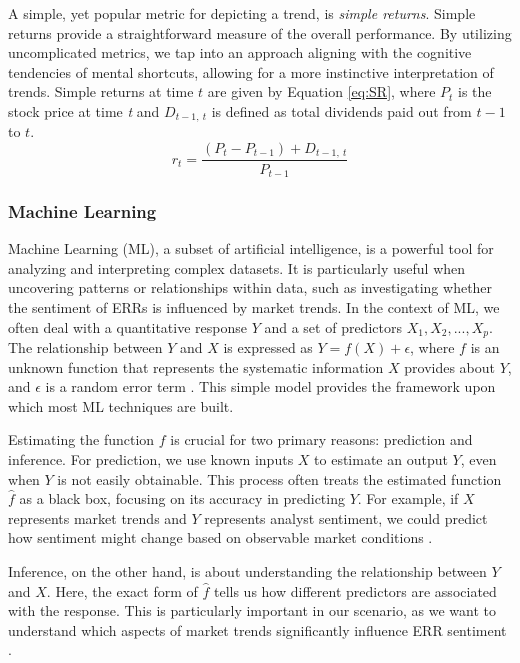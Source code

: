 A simple, yet popular metric for depicting a trend, is \textit{simple returns}. Simple returns provide a straightforward measure of the overall performance. By utilizing uncomplicated metrics, we tap into an approach aligning with the cognitive tendencies of mental shortcuts, allowing for a more instinctive interpretation of trends. Simple returns at time \(t\) are given by Equation \ref{eq:SR}, where $P_t$ is the stock price at time \textit{t} and \(D_{t-1,\:t}\) is defined as total dividends paid out from \(t-1\) to \(t\).
\begin{equation}\label{eq:SR}
    r_t=\frac{(P_t-P_{t-1})+D_{t-1,\:t}}{P_{t-1}}
\end{equation}

\subsubsection{Machine Learning}
Machine Learning (ML), a subset of artificial intelligence, is a powerful tool for analyzing and interpreting complex datasets. It is particularly useful when uncovering patterns or relationships within data, such as investigating whether the sentiment of ERRs is influenced by market trends. In the context of ML, we often deal with a quantitative response \(Y\) and a set of predictors \(X_1, X_2, ..., X_p\). The relationship between \(Y\) and \(X\) is expressed as \(Y=f(X)+\epsilon\), where \(f\) is an unknown function that represents the systematic information \(X\) provides about \(Y\), and \(\epsilon\) is a random error term \parencite{witten2013introduction}. This simple model provides the framework upon which most ML techniques are built.

Estimating the function \(f\) is crucial for two primary reasons: prediction and inference. For prediction, we use known inputs \(X\) to estimate an output \(Y\), even when \(Y\) is not easily obtainable. This process often treats the estimated function \(\hat{f}\) as a black box, focusing on its accuracy in predicting \(Y\). For example, if \(X\) represents market trends and \(Y\) represents analyst sentiment, we could predict how sentiment might change based on observable market conditions \parencite{witten2013introduction}.

Inference, on the other hand, is about understanding the relationship between \(Y\) and \(X\). Here, the exact form of \(\hat{f}\) tells us how different predictors are associated with the response. This is particularly important in our scenario, as we want to understand which aspects of market trends significantly influence ERR sentiment \parencite{witten2013introduction}.

